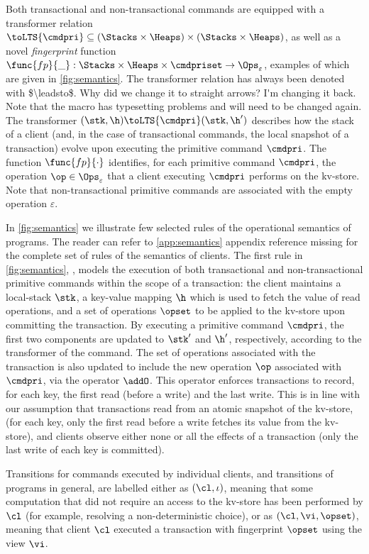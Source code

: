 Both transactional and non-transactional commands are equipped with a transformer relation $\toLTS{\cmdpri} \subseteq 
(\Stacks \times \Heaps) \times (\Stacks \times \Heaps)$, as well as a 
novel \emph{fingerprint} function $\func{fp}{\_} : \Stacks \times \Heaps \times \cmdpriset \rightarrow \Ops_{\varepsilon}$, 
examples of which are given in \cref{fig:semantics}. 
\ac{The transformer relation has always been denoted with $\leadsto$. Why did we change it to straight arrows? 
I'm changing it back. Note that the macro has typesetting problems and will need to be changed again.}
The transformer $(\stk, \h)  \toLTS{\cmdpri} (\stk, \h')$ describes how the stack of a client (and, in the case of transactional commands, 
the local snapshot of a transaction) evolve upon executing the primitive command $\cmdpri$.
The function $\func{fp}{\cdot}$ identifies, for each primitive command $\cmdpri$, the operation $\op \in \Ops_{\varepsilon}$
that a client executing $\cmdpri$  performs on the kv-store. Note that non-transactional primitive commands are associated with 
the empty operation $\varepsilon$. 

In \cref{fig:semantics} we illustrate few selected rules of the operational semantics of programs. 
The reader can refer to \cref{app:semantics} {\color{red} appendix reference missing} 
for the complete set of rules of the semantics of clients. 
The first rule in \cref{fig:semantics}, , models the execution of both transactional and 
non-transactional primitive commands within the scope of a transaction: the client maintains 
a local-stack $\stk$, a key-value mapping $\h$ which is used to fetch the value of read operations, 
and a set of operations $\opset$ to be applied to the kv-store upon committing the transaction. 
By executing a primitive command $\cmdpri$,  the first two components are updated to $\stk'$ and 
$\h'$, respectively, according to the transformer of the command. The set of operations associated with 
the transaction is also updated to include the new operation $\op$ associated with $\cmdpri$, 
via the operator $\addO$. This operator enforces transactions to record, for each key, the first 
read (before a write) and the last write. This is in line with our assumption that transactions read from an atomic 
snapshot of the kv-store,
(for each key, only the first read before a write fetches its value from the kv-store), 
and clients observe either none or all the effects of a transaction (only the last write of each key is committed).

Transitions for commands executed by individual clients, and transitions of programs in general, are labelled 
either as $(\cl, \iota)$, meaning that some computation that did not require an access to the kv-store 
has been performed by $\cl$ (for example, resolving a non-deterministic choice), or as 
$(\cl, \vi, \opset)$, meaning that client $\cl$ executed a transaction with fingerprint $\opset$ using 
the view $\vi$.
 
